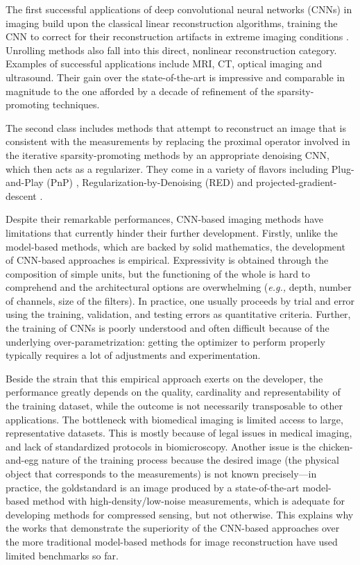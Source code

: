 \documentclass[journal]{IEEEtran}
\begin{document}
The first successful applications of deep convolutional neural networks (CNNs) in imaging build upon the classical linear reconstruction algorithms, training the CNN to correct for their reconstruction artifacts in extreme imaging conditions \cite{jin2017deep,chen2017low,hyun2018deep,monakhova2019learned,perdios2020cnn}. Unrolling methods \cite{gregor2010learning,chen2016trainable,sun2016deep,aggarwal2018modl,adler2018learned,monga2021algorithm} also fall into this direct, nonlinear reconstruction category. Examples of successful applications include MRI, CT, optical imaging and ultrasound. Their gain over the state-of-the-art is impressive and comparable in magnitude to the one afforded by a decade of refinement of the sparsity-promoting techniques.

The second class includes methods that attempt to reconstruct an image that is consistent with the measurements by replacing the proximal operator involved in the iterative sparsity-promoting methods by an appropriate denoising CNN, which then acts as a regularizer. They come in a variety of flavors including Plug-and-Play (PnP) \cite{venkatakrishnan2013plug,ryu2019plug,zhang2021plug,sun2021scalable}, Regularization-by-Denoising (RED) \cite{romano2017little,sun2019block,wu2020simba} and projected-gradient-descent \cite{rick2017one,gupta2018cnn}.

Despite their remarkable performances, CNN-based imaging methods have limitations that currently hinder their further development. Firstly, unlike the model-based methods, which are backed by solid mathematics, the development of CNN-based approaches is empirical. Expressivity is obtained through the composition of simple units, but the functioning of the whole is hard to comprehend and the architectural options are overwhelming (\textit{e.g.,} depth, number of channels, size of the filters). In practice, one usually proceeds by trial and error using the training, validation, and testing errors as
quantitative criteria. Further, the training of CNNs is poorly understood and often difficult because of the underlying over-parametrization: getting the optimizer to perform properly typically requires a lot of adjustments and experimentation.

Beside the strain that this empirical approach exerts on the developer, the performance greatly depends on the quality, cardinality and representability of the
training dataset, while the outcome is not necessarily transposable to other applications. The bottleneck with biomedical imaging is limited access to large, representative datasets. This is mostly because of legal issues in medical imaging, and lack of standardized protocols in biomicroscopy. Another issue is the chicken-and-egg nature of the training process because the desired image (the physical object that corresponds to the measurements) is not known precisely---in practice, the goldstandard is an image produced by a state-of-the-art model-based method with high-density/low-noise measurements, which is adequate for developing methods for compressed sensing, but not otherwise. This explains why the works that demonstrate the superiority of the
CNN-based approaches over the more traditional model-based methods for image reconstruction have used limited benchmarks so far.
\end{document}
